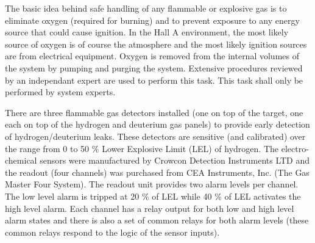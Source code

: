 \begin{safetyen}{0}{0}
The basic idea behind safe handling of any flammable or explosive
gas is to eliminate oxygen (required for burning) and to prevent exposure
to any energy source that could cause ignition. In the Hall A environment,
the most likely source of oxygen is of course the atmosphere and the
most likely ignition sources are from electrical equipment. Oxygen
is removed from the internal volumes of the system by pumping and
purging the system. Extensive procedures reviewed by an independant
expert are used to perform this task. This task shall only be performed
by system experts.

There are three flammable gas detectors installed (one on top of the
target, one each on top of the hydrogen and deuterium gas panels)
to provide early detection of hydrogen/deuterium leaks. These detectors
are sensitive (and calibrated) over the range from 0 to 50 $\%$ Lower
Explosive Limit (LEL) of hydrogen. The electro-chemical sensors were
manufactured by Crowcon Detection Instruments LTD and the readout
(four channels) was purchased from CEA Instruments, Inc. (The Gas
Master Four System). The readout unit provides two alarm levels per
channel. The low level alarm is tripped at 20 $\%$ of LEL while 40
$\%$ of LEL activates the high level alarm. Each channel has a relay
output for both low and high level alarm states and there is also
a set of common relays for both alarm levels (these common relays
respond to the logic of the sensor
inputs). 

\end{safetyen}
